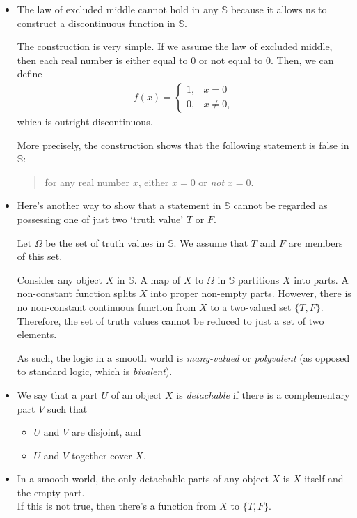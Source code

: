 \documentclass[10pt]{article}
\begin{document}
\begin{itemize}
  	\item The law of excluded middle cannot hold in any $\mathbb{S}$ because it allows us to construct a discontinuous function in $\mathbb{S}$.

  	The construction is very simple. If we assume the law of excluded middle, then each real number is either equal to $0$ or not equal to $0$. Then, we can define
  	\begin{align*}
  		f(x) = \begin{cases}
  			1, & x = 0\\
  			0, & x \neq 0,
  		\end{cases}
  	\end{align*}
  	which is outright discontinuous.

  	More precisely, the construction shows that the following statement is false in $\mathbb{S}$:
  	\begin{quote}
  		for any real number $x$, either $x = 0$ or \emph{not} $x = 0$.
  	\end{quote}

  	\item Here's another way to show that a statement in $\mathbb{S}$ cannot be regarded as possessing one of just two `truth value' $T$ or $F$.

  	Let $\Omega$ be the set of truth values in $\mathbb{S}$. We assume that $T$ and $F$ are members of this set.

  	 Consider any object $X$ in $\mathbb{S}$. A map of $X$ to $\Omega$ in $\mathbb{S}$ partitions $X$ into parts. A non-constant function splits $X$ into proper non-empty parts. However, there is no non-constant continuous function from $X$ to a two-valued set $\{ T, F\}$. Therefore, the set of truth values cannot be reduced to just a set of two elements.

  	 As such, the logic in a smooth world is \emph{many-valued} or \emph{polyvalent} (as opposed to standard logic, which is \emph{bivalent}).

  	 \item We say that a part $U$ of an object $X$ is \emph{detachable} if there is a complementary part $V$ such that
  	 \begin{itemize}
  	 	\item $U$ and $V$ are disjoint, and
  	 	\item $U$ and $V$ together cover $X$.
  	 \end{itemize}

  	 \item In a smooth world, the only detachable parts of any object $X$ is $X$ itself and the empty part.\\
  	 If this is not true, then there's a function from $X$ to $\{ T, F\}$.


\end{itemize}
\end{document}
